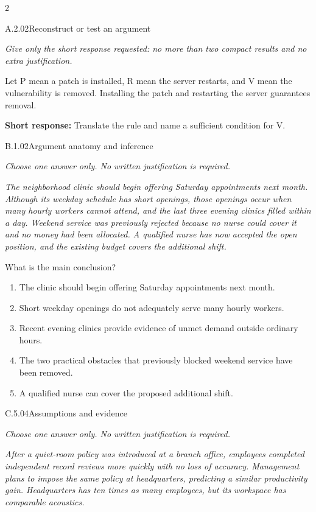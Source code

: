 \documentclass[9pt]{extarticle}
\newcommand{\choice}[1]{\item #1}
\begin{document}
\begin{multicols}{2}
\begin{DenseCoreProblem}{A.2.02}{Reconstruct or test an argument}
{\scriptsize\textit{Give only the short response requested: no more than two compact results and no extra justification.}\par}
Let P mean a patch is installed, R mean the server restarts, and V mean the vulnerability is removed. Installing the patch and restarting the server guarantees removal.

\textbf{Short response:} Translate the rule and name a sufficient condition for V.
\end{DenseCoreProblem}
\begin{DenseCoreProblem}{B.1.02}{Argument anatomy and inference}
{\scriptsize\textit{Choose one answer only. No written justification is required.}\par}
\emph{The neighborhood clinic should begin offering Saturday appointments next month. Although its weekday schedule has short openings, those openings occur when many hourly workers cannot attend, and the last three evening clinics filled within a day. Weekend service was previously rejected because no nurse could cover it and no money had been allocated. A qualified nurse has now accepted the open position, and the existing budget covers the additional shift.}

What is the main conclusion?
\begin{enumerate}[label=(\alph*)]
  \choice{The clinic should begin offering Saturday appointments next month.}
  \choice{Short weekday openings do not adequately serve many hourly workers.}
  \choice{Recent evening clinics provide evidence of unmet demand outside ordinary hours.}
  \choice{The two practical obstacles that previously blocked weekend service have been removed.}
  \choice{A qualified nurse can cover the proposed additional shift.}
\end{enumerate}
\end{DenseCoreProblem}
\columnbreak
\begin{DenseCoreProblem}{C.5.04}{Assumptions and evidence}
{\scriptsize\textit{Choose one answer only. No written justification is required.}\par}
\emph{After a quiet-room policy was introduced at a branch office, employees completed independent record reviews more quickly with no loss of accuracy. Management plans to impose the same policy at headquarters, predicting a similar productivity gain. Headquarters has ten times as many employees, but its workspace has comparable acoustics.}


\end{DenseCoreProblem}
\end{multicols}
\end{document}

